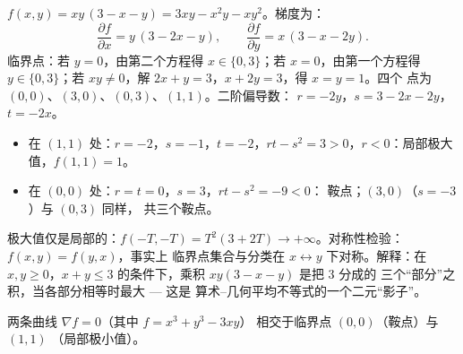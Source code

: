 \begin{example}[四点的完整研究]
\label{ex:b1:multivar:fourpoints}
$f(x, y) = xy\,(3 - x - y) = 3xy - x^2y - xy^2$。梯度为：
\[
\frac{\partial f}{\partial x} = y\,(3 - 2x - y),
\qquad
\frac{\partial f}{\partial y} = x\,(3 - x - 2y).
\]
临界点：若 $y = 0$，由第二个方程得 $x \in
\{0, 3\}$；若 $x = 0$，由第一个方程得 $y \in \{0, 3\}$；若 $xy
\neq 0$，解 $2x + y = 3$，$x + 2y = 3$，得 $x = y = 1$。四个
点为 $(0,0)$、$(3,0)$、$(0,3)$、$(1,1)$。二阶偏导数：
$r = -2y$，$s = 3 - 2x - 2y$，$t = -2x$。
\begin{itemize}
  \item 在 $(1,1)$ 处：$r = -2$，$s = -1$，$t = -2$，$rt - s^2 = 3 >
        0$，$r < 0$：局部极大值，$f(1,1) = 1$。
  \item 在 $(0,0)$ 处：$r = t = 0$，$s = 3$，$rt - s^2 = -9 < 0$：
        鞍点；$(3, 0)$（$s = -3$）与 $(0, 3)$ 同样，
        共三个鞍点。
\end{itemize}
极大值仅是局部的：$f(-T, -T) = T^2(3 + 2T) \to
+\infty$。对称性检验：$f(x, y) = f(y, x)$，事实上
临界点集合与分类在 $x
\leftrightarrow y$ 下对称。解释：在 $x, y \geq 0$，$x + y \leq 3$
的条件下，乘积 $xy(3 - x - y)$ 是把 $3$ 分成的
三个“部分”之积，当各部分相等时最大
--- 这是 算术–几何平均不等式的一个二元“影子”。
\end{example}

\begin{omfigure}

{\small 两条曲线 $\nabla f = 0$（其中 $f = x^3 + y^3 - 3xy$）
相交于临界点 $(0,0)$（鞍点）与 $(1,1)$
（局部极小值）。}
\end{omfigure}

